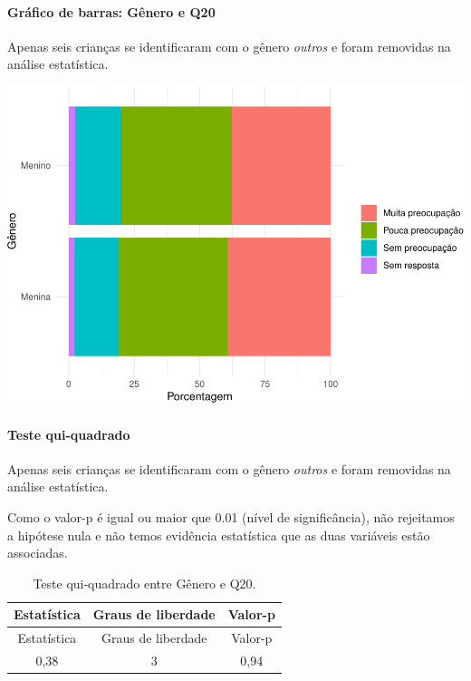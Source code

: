 \documentclass[]{article}
\let\oldparagraph\paragraph
\renewcommand{\paragraph}[1]{\oldparagraph{#1}\mbox{}}
\begin{document}
\hypertarget{gruxe1fico-de-barras-guxeanero-e-q20}{%
\paragraph{Gráfico de barras: Gênero e Q20}\label{gruxe1fico-de-barras-guxeanero-e-q20}}

Apenas seis crianças se identificaram com o gênero \emph{outros} e foram removidas na análise estatística.

\begin{center}\includegraphics[width=0.75\linewidth]{relatorio_covid19_files/figure-latex/unnamed-chunk-378-1} \end{center}

\hypertarget{teste-qui-quadrado-33}{%
\paragraph{Teste qui-quadrado}\label{teste-qui-quadrado-33}}

Apenas seis crianças se identificaram com o gênero \emph{outros} e foram removidas na análise estatística.

Como o valor-p é igual ou maior que 0.01 (nível de significância), não rejeitamos a hipótese nula e não temos evidência estatística que as duas variáveis estão associadas.

\begin{longtable}[]{@{}ccc@{}}
\caption{\label{tab:unnamed-chunk-380}Teste qui-quadrado entre Gênero e Q20.}\tabularnewline
\toprule
Estatística & Graus de liberdade & Valor-p\tabularnewline
\midrule
\endfirsthead
\toprule
Estatística & Graus de liberdade & Valor-p\tabularnewline
\midrule
\endhead
0,38 & 3 & 0,94\tabularnewline
\bottomrule
\end{longtable}

\cleardoublepage
\end{document}
